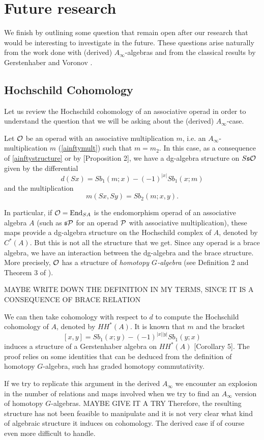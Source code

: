 \documentclass[join.tex]{subfiles}
\begin{document}
\section{Future research}

We finish by outlining some question that remain open after our research that would be interesting to investigate in the future. These questions arise naturally from the work done with (derived) $A_\infty$-algebras and from the classical results by Gerstenhaber and Voronov \cite{GV}.

\subsection{Hochschild Cohomology}
Let us review the Hochschild cohomology of an associative operad in order to understand the question that we will be asking about the (derived) $A_\infty$-case.

Let ${\mathcal O}$ be an operad with an associative multiplication $m$, i.e. an $A_\infty$-multiplication $m$ (\cref{ainftymult}) such that $m=m_2$. In this case, as a consequence of \cref{ainftystructure} or by \cite{GV}[Proposition 2], we have a dg-algebra structure on $S\mathfrak{s}{\mathcal O}$ given by the differential
\[d(Sx) =  Sb_1(m; x) -(-1)^{|x|}Sb_1(x; m)\]
and the multiplication
\[m(Sx,Sy) = Sb_2(m;x,y).\]

In particular, if ${\mathcal O} = \operatorname{End}_{SA}$ is the endomorphism operad of an associative algebra $A$ (such as $\mathfrak{s}\mathcal{P}$ for an operad $\mathcal{P}$ with associative multiplication), these maps provide a dg-algebra structure on the Hochschild complex of $A$, denoted by $C^*(A)$. But this is not all the structure that we get. Since any operad is a brace algebra, we have an interaction between the dg-algebra and the brace structure. More precisely, ${\mathcal O}$ has a structure of \emph{homotopy $G$-algebra} (see Definition 2 and Theorem 3 of \cite{GV}). 

MAYBE WRITE DOWN THE DEFINITION IN MY TERMS, SINCE IT IS A CONSEQUENCE OF BRACE RELATION

 We can then take cohomology with respect to $d$ to compute the Hochschild cohomology of $A$, denoted by $HH^*(A)$. It is known that $m$ and the bracket 
\[[x,y]=Sb_1(x; y) -(-1)^{|x||y|}Sb_1(y; x)\]
induces a structure of a Gerstenhaber algebra on $HH^*(A)$ \cite{GV}[Corollary 5]. The proof relies on some identities that can be deduced from the definition of homotopy $G$-algebra, such has graded homotopy commutativity. 

If we try to replicate this argument in the derived $A_\infty$ we encounter an explosion in the number of relations and maps involved when we try to find an $A_\infty$ version of homotopy $G$-algebras. MAYBE GIVE IT A TRY Therefore, the resulting structure has not been feasible to manipulate and it is not very clear what kind of algebraic structure it induces on cohomology. The derived case if of course even more difficult to handle.
\end{document}
